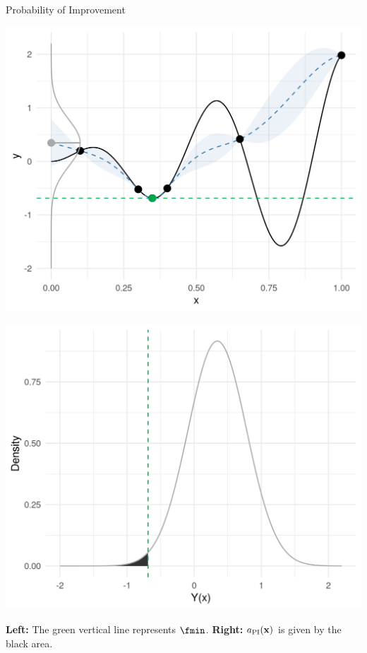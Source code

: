 \documentclass[11pt,compress,t,notes=noshow, xcolor=table]{beamer}
\begin{document}
\begin{frame}{Probability of Improvement}
 {
\begin{minipage}[b]{0.45\textwidth}
  \includegraphics[width = \textwidth]{figure_man/bayesian_loop_sm_normal_fmin.png}
\end{minipage}
\hfill
\begin{minipage}[b]{0.45\textwidth}
  \includegraphics[width = \textwidth]{figure_man/bayesian_loop_pi_0.png}
\end{minipage}

\begin{footnotesize}
    \textbf{Left:} The green vertical line represents $\fmin$.
    \textbf{Right:} $a_{\text{PI}}(\mathbf{x})$ is given by the black area.
\end{footnotesize}
}


\end{frame}
\end{document}
